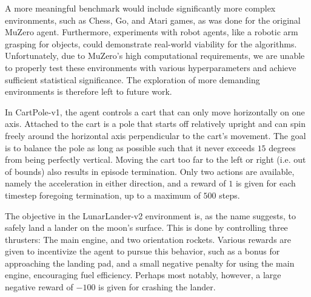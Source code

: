 A more meaningful benchmark would include significantly more complex environments, such as Chess, Go, and Atari games, as was done for the original MuZero agent. Furthermore, experiments with robot agents, like a robotic arm grasping for objects, could demonstrate real-world viability for the algorithms. Unfortunately, due to MuZero's high computational requirements, we are unable to properly test these environments with various hyperparameters and achieve sufficient statistical significance. The exploration of more demanding environments is therefore left to future work.

In CartPole-v1, the agent controls a cart that can only move horizontally on one axis. Attached to the cart is a pole that starts off relatively upright and can spin freely around the horizontal axis perpendicular to the cart's movement. The goal is to balance the pole as long as possible such that it never exceeds $15$ degrees from being perfectly vertical. Moving the cart too far to the left or right (i.e. out of bounds) also results in episode termination. Only two actions are available, namely the acceleration in either direction, and a reward of $1$ is given for each timestep foregoing termination, up to a maximum of $500$ steps.

The objective in the LunarLander-v2 environment is, as the name suggests, to safely land a lander on the moon's surface. This is done by controlling three thrusters: The main engine, and two orientation rockets. Various rewards are given to incentivize the agent to pursue this behavior, such as a bonus for approaching the landing pad, and a small negative penalty for using the main engine, encouraging fuel efficiency. Perhaps most notably, however, a large negative reward of $-100$ is given for crashing the lander.